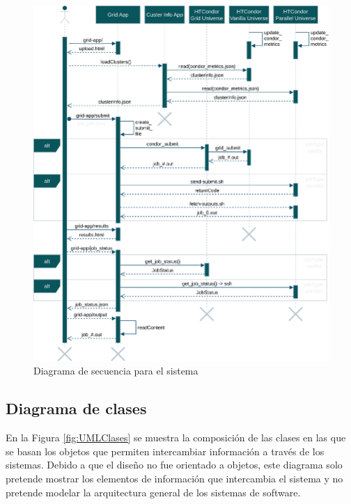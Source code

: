 \begin{figure}[H]
	\centering
	\includegraphics[scale=0.11]{tablas-images/UML/Diagramas HTCondor-Secuencia.drawio.png}
	\caption{Diagrama de secuencia para el sistema}
    \label{fig:UMLSecuencia}
\end{figure}

\subsection{Diagrama de clases}
\noindent
En la Figura \ref{fig:UMLClases} se muestra la composición de las clases en las que se basan los objetos que permiten intercambiar información a través de los sistemas. Debido a que el diseño no fue orientado a objetos, este diagrama solo pretende mostrar los elementos de información que intercambia el sistema y no pretende modelar la arquitectura general de los sistemas de software.

